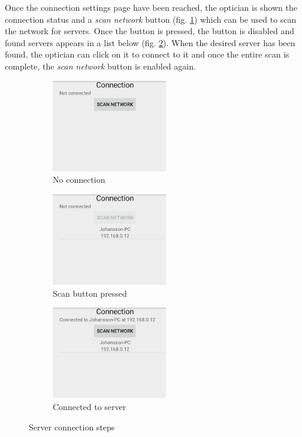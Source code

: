 \documentclass[12pt,a4paper,notitlepage]{report}
\begin{document}
Once the connection settings page have been reached, the optician is shown the connection status and a \textit{scan network} button (fig. \ref{fig:scan1}) which can be used to scan the network for servers. Once the button is pressed, the button is disabled and found servers appears in a list below (fig. \ref{fig:scan2}). When the desired server has been found, the optician can click on it to connect to it and once the entire scan is complete, the \textit{scan network} button is enabled again.

\begin{figure}[ht!]
\centering
\begin{subfigure}{.5\textwidth}
  \centering
  \includegraphics[width=50mm]{images/appgui/scan1.png}
  \caption{No connection}
  \label{fig:scan1}
\end{subfigure}%
\begin{subfigure}{.5\textwidth}
  \centering
  \includegraphics[width=50mm]{images/appgui/scan2.png}
  \caption{Scan button pressed}
  \label{fig:scan2}
\end{subfigure}
\begin{subfigure}{.5\textwidth}
  \centering
  \includegraphics[width=50mm]{images/appgui/scan3.png}
  \caption{Connected to server}
  \label{fig:scan3}
\end{subfigure}
\caption{Server connection steps}
\label{fig:scan}
\end{figure}
\end{document}
